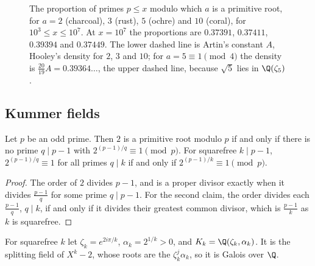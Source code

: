 \begin{figure}[ht]
\centering
{}
\caption{The proportion of primes $p\le x$ modulo which $a$ is a primitive root, for $a=2$ (charcoal), $3$ (rust), $5$ (ochre) and $10$ (coral), for $10^3\le x\le10^7$. At $x=10^7$ the proportions are $0.37391$, $0.37411$, $0.39394$ and $0.37449$. The lower dashed line is Artin's constant $A$, Hooley's density for $2$, $3$ and $10$; for $a=5\equiv1\pmod4$ the density is $\frac{20}{19}A=0.39364\ldots$, the upper dashed line, because $\sqrt5$ lies in $\Q(\zeta_5)$.}
\label{fig:artin}
\end{figure}

\subsection*{Kummer fields}

\begin{lemma}\label{lem:primroot}
Let $p$ be an odd prime. Then $2$ is a primitive root modulo $p$ if and only if there is no prime $q\mid p-1$ with $2^{(p-1)/q}\equiv1\pmod p$. For squarefree $k\mid p-1$, $2^{(p-1)/q}\equiv1$ for all primes $q\mid k$ if and only if $2^{(p-1)/k}\equiv1\pmod p$.
\end{lemma}
\begin{proof}
The order of $2$ divides $p-1$, and is a proper divisor exactly when it divides $\frac{p-1}q$ for some prime $q\mid p-1$. For the second claim, the order divides each $\frac{p-1}q$, $q\mid k$, if and only if it divides their greatest common divisor, which is $\frac{p-1}k$ as $k$ is squarefree.
\end{proof}

For squarefree $k$ let $\zeta_k=e^{2i\pi/k}$, $\alpha_k=2^{1/k}>0$, and $K_k=\Q(\zeta_k,\alpha_k)$. It is the splitting field of $X^k-2$, whose roots are the $\zeta_k^j\alpha_k$, so it is Galois over $\Q$.

